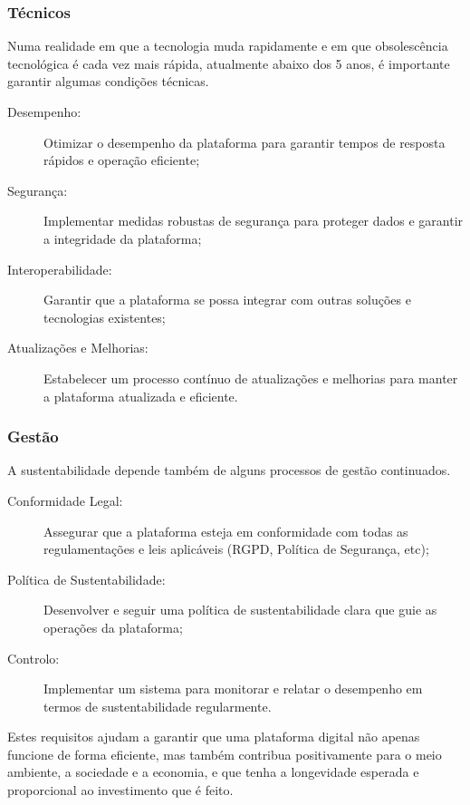 \subsubsection{Técnicos}

Numa realidade em que a tecnologia muda rapidamente e em que obsolescência tecnológica é cada vez mais rápida, atualmente abaixo 
dos 5 anos, é importante garantir algumas condições técnicas.

\begin{description}
    \item[Desempenho:] Otimizar o desempenho da plataforma para garantir tempos de resposta rápidos e operação eficiente;
    \item[Segurança:] Implementar medidas robustas de segurança para proteger dados e garantir a integridade da plataforma;
    \item[Interoperabilidade:] Garantir que a plataforma se possa integrar com outras soluções e tecnologias existentes;
    \item[Atualizações e Melhorias:] Estabelecer um processo contínuo de atualizações e melhorias para manter a plataforma 
    atualizada e eficiente.
\end{description}

\subsubsection{Gestão}

A sustentabilidade depende também de alguns processos de gestão continuados.

\begin{description}
    \item[Conformidade Legal:] Assegurar que a plataforma esteja em conformidade com todas as regulamentações e leis aplicáveis
    (RGPD, Política de Segurança, etc);
    \item[Política de Sustentabilidade:] Desenvolver e seguir uma política de sustentabilidade clara que guie as operações da 
    plataforma;
    \item[Controlo:] Implementar um sistema para monitorar e relatar o desempenho em termos de sustentabilidade 
    regularmente.
\end{description}

Estes requisitos ajudam a garantir que uma plataforma digital não apenas funcione de forma eficiente, mas também 
contribua positivamente para o meio ambiente, a sociedade e a economia, e que tenha a longevidade esperada e proporcional ao 
investimento que é feito.



